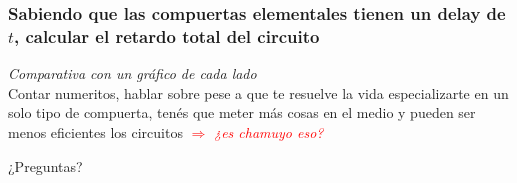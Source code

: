 \documentclass[mathserif,hyperref={pdfpagelabels=false}]{beamer}
\begin{document}
\begin{frame}
\frametitle{\small Sabiendo que las compuertas elementales tienen un delay
de $t$, calcular el retardo total del circuito}
\textit{Comparativa con un gráfico de cada lado}
\\ Contar numeritos, hablar sobre pese a que te resuelve la vida
especializarte en un solo tipo de compuerta, tenés que meter más cosas en el
medio y pueden ser menos eficientes los circuitos
\textcolor{red}{$\Rightarrow$ \textit{¿es chamuyo eso?}}
\end{frame}


\begin{frame}
¿Preguntas?
\end{frame}
\end{document}
